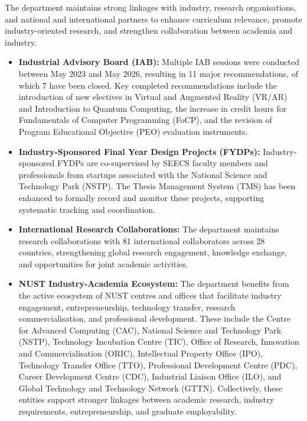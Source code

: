 The department maintains strong linkages with industry,
research organisations, and national and international
partners to enhance curriculum relevance, promote
industry-oriented research, and strengthen collaboration
between academia and industry.

\begin{itemize}

    \item \textbf{Industrial Advisory Board (IAB):}
    Multiple IAB sessions were conducted between May 2023 and May 2026, resulting in 11 major recommendations, of which
    7 have been closed. Key completed recommendations
    include the introduction of new electives in Virtual
    and Augmented Reality (VR/AR) and Introduction to
    Quantum Computing, the increase in credit hours for
    Fundamentals of Computer Programming (FoCP), and the
    revision of Program Educational Objective (PEO)
    evaluation instruments.

    \item \textbf{Industry-Sponsored Final Year Design
    Projects (FYDPs):}
    Industry-sponsored FYDPs are co-supervised by SEECS
    faculty members and professionals from startups
    associated with the National Science and Technology
    Park (NSTP). The Thesis Management System (TMS) has
    been enhanced to formally record and monitor these
    projects, supporting systematic tracking and
    coordination.

    \item \textbf{International Research Collaborations:}
    The department maintains research collaborations
    with 81 international collaborators across
    28 countries, strengthening global research
    engagement, knowledge exchange, and opportunities
    for joint academic activities.

    \item \textbf{NUST Industry-Academia Ecosystem:}
    The department benefits from the active ecosystem
    of NUST centres and offices that facilitate
    industry engagement, entrepreneurship, technology
    transfer, research commercialisation, and
    professional development. These include the
    Centre for Advanced Computing (CAC), National
    Science and Technology Park (NSTP), Technology
    Incubation Centre (TIC), Office of Research,
    Innovation and Commercialisation (ORIC),
    Intellectual Property Office (IPO), Technology
    Transfer Office (TTO), Professional Development
    Centre (PDC), Career Development Centre (CDC),
    Industrial Liaison Office (ILO), and Global
    Technology and Technology Network (GTTN).
    Collectively, these entities support stronger
    linkages between academic research, industry
    requirements, entrepreneurship, and graduate
    employability.

\end{itemize}

